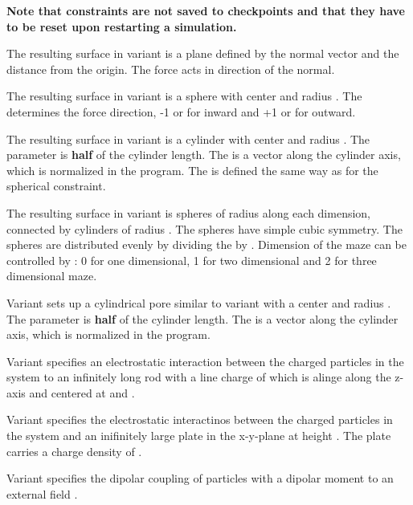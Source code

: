 \textbf{Note that constraints are not saved to checkpoints and that they have to
be reset upon restarting a simulation.}

The resulting surface in variant  is a plane defined by the
normal vector    and the distance
 from the origin. The force acts in direction of the normal. 

The resulting surface in variant
 is a sphere with center    and radius
. The  determines the force direction, -1 or
 for inward and +1 or  for outward. 

The resulting surface
in variant  is a cylinder with center  
 and radius . The  parameter is \textbf{half} 
of the cylinder length. The  is a
vector along the cylinder axis, which is normalized in the program.
The  is defined the same way as for the spherical
constraint. 

The resulting surface in variant  is 
spheres of radius  along each dimension, connected by
cylinders of radius . The spheres have simple cubic
symmetry. The spheres are distributed evenly by dividing the
 by .  Dimension of the maze can be controlled by
: 0 for one dimensional, 1 for two dimensional and 2 for three
dimensional maze.

Variant  sets up a cylindrical pore similar to variant  
with a center
 and radius . The  parameter is \textbf{half} 
of the cylinder length. The  is a
vector along the cylinder axis, which is normalized in the program.

Variant  specifies an electrostatic interaction between the charged
particles in the system to an infinitely long rod with a
line charge of  which is alinge along the z-axis and centered at
 and .

Variant  specifies the electrostatic interactinos between the charged
particles in the system and an inifinitely large plate in the x-y-plane at
height . The plate carries a charge density of .
  
Variant  specifies the dipolar coupling of particles with a dipolar
moment to an external field   . 

